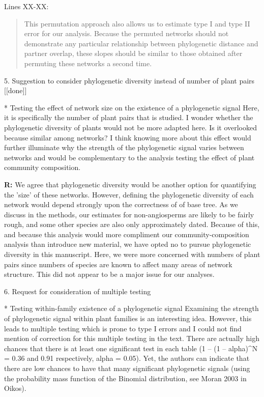 \documentclass[12pt]{letter}
\newenvironment{refquote}{\bigskip \begin{it}}{\end{it}\smallskip}
\begin{document}
	Lines XX-XX:

	\begin{quotation}
		This permutation approach also allows us to estimate type I and type II 
	    error for our analysis. Because the permuted networks should not demonstrate any particular relationship between phylogenetic distance and partner overlap, these slopes should be similar to those obtained after permuting these networks a second time.
	\end{quotation}


5. Suggestion to consider phylogenetic diversity instead of number of plant pairs [[done]]

	\begin{refquote}
		* Testing the effect of network size on the existence of a phylogenetic signal
		Here, it is specifically the number of plant pairs that is studied. I wonder whether the phylogenetic diversity of plants would not be more adapted here. Is it overlooked because similar among networks?
		I think knowing more about this effect would further illuminate why the strength of the phylogenetic signal varies between networks and would be complementary to the analysis testing the effect of plant community composition.
	\end{refquote}


	\textbf{R:} We agree that phylogenetic diversity would be another option for quantifying the 'size' of these networks. However, defining the phylogenetic diversity of each network would depend strongly upon the correctness of of base tree. As we discuss in the methods, our estimates for non-angiosperms are likely to be fairly rough, and some other species are also only approximately dated. Because of this, and because this analysis would more compliment our community-composition analysis than introduce new material, we have opted no to pursue phylogenetic diversity in this manuscript. Here, we were more concerned with numbers of plant pairs since numbers of species are known to affect many areas of network structure. This did not appear to be a major issue for our analyses.


6. Request for consideration of multiple testing

	\begin{refquote}
		* Testing within-family existence of a phylogenetic signal
		Examining the strength of phylogenetic signal within plant families is an interesting idea. However, this leads to multiple testing which is prone to type I errors and I could not find mention of correction for this multiple testing in the text. There are actually high chances that there is at least one significant test in each table (1 – (1 – alpha)^N = 0.36 and 0.91 respectively, alpha = 0.05). Yet, the authors can indicate that there are low chances to have that many significant phylogenetic signals (using the probability mass function of the Binomial distribution, see Moran 2003 in Oikos).
	\end{refquote}
\end{document}
